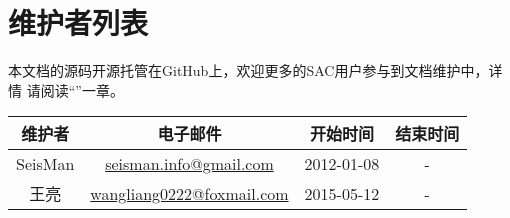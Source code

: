 {\section*{维护者列表}}

本文档的源码开源托管在GitHub上，欢迎更多的SAC用户参与到文档维护中，详情
请阅读``''一章。
\begin{table}[H]
\centering
\begin{tabular}{cccc}
\toprule
维护者      & 电子邮件              &   开始时间    &   结束时间     \\
\midrule
SeisMan  & \url{seisman.info@gmail.com}    &  2012-01-08   &   -     \\
王亮     & \url{wangliang0222@foxmail.com} &  2015-05-12   &   -     \\
\bottomrule
\end{tabular}
\end{table}

